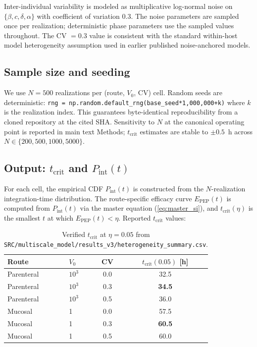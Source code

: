 \documentclass[11pt]{article}
\theoremstyle{definition}
\theoremstyle{remark}
\newcommand{\Pint}{P_{\text{int}}}
\newcommand{\Epep}{E_{\text{PEP}}}
\newcommand{\tcrit}{t_{\text{crit}}}
\begin{document}
Inter-individual variability is modeled as multiplicative log-normal noise on $\{\beta, c, \delta, \alpha\}$ with coefficient of variation $0.3$. The noise parameters are sampled once per realization; deterministic phase parameters use the sampled values throughout. The CV $= 0.3$ value is consistent with the standard within-host model heterogeneity assumption used in earlier published noise-anchored models.

\subsection{Sample size and seeding}

We use $N = 500$ realizations per (route, $V_{0}$, CV) cell. Random seeds are deterministic: \texttt{rng = np.random.default\_rng(base\_seed*1{,}000{,}000+k)} where $k$ is the realization index. This guarantees byte-identical reproducibility from a cloned repository at the cited SHA. Sensitivity to $N$ at the canonical operating point is reported in main text Methods; $\tcrit$ estimates are stable to $\pm 0.5$~h across $N \in \{200, 500, 1000, 5000\}$.

\subsection{Output: \texorpdfstring{$\tcrit$}{tcrit} and \texorpdfstring{$\Pint(t)$}{Pint(t)}}

For each cell, the empirical CDF $\Pint(t)$ is constructed from the $N$-realization integration-time distribution. The route-specific efficacy curve $\Epep(t)$ is computed from $\Pint(t)$ via the master equation (\ref{eq:master_si}), and $\tcrit(\eta)$ is the smallest $t$ at which $\Epep(t) < \eta$. Reported $\tcrit$ values:

\begin{table}[H]
\centering
\small
\caption{Verified $\tcrit$ at $\eta = 0.05$ from \texttt{SRC/multiscale\_model/results\_v3/heterogeneity\_summary.csv}.}
\begin{tabular}{@{}llcc@{}}
\toprule
\textbf{Route} & \textbf{$V_{0}$} & \textbf{CV} & \textbf{$\tcrit(0.05)$ [h]} \\
\midrule
Parenteral  & $10^{3}$ & 0.0 & 32.5 \\
Parenteral  & $10^{3}$ & 0.3 & \textbf{34.5} \\
Parenteral  & $10^{3}$ & 0.5 & 36.0 \\
Mucosal     & 1        & 0.0 & 57.5 \\
Mucosal     & 1        & 0.3 & \textbf{60.5} \\
Mucosal     & 1        & 0.5 & 60.0 \\
\bottomrule
\end{tabular}
\end{table}
\end{document}

